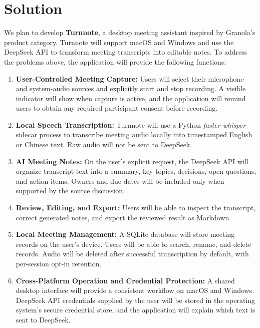 \documentclass[12pt,a4paper]{article}
\begin{document}
\section*{Solution}
We plan to develop \textbf{Turnnote}, a desktop meeting assistant inspired by Granola's product category. Turnnote will support macOS and Windows and use the DeepSeek API to transform meeting transcripts into editable notes. To address the problems above, the application will provide the following functions:\par
\begin{enumerate}
\item \textbf{User-Controlled Meeting Capture:} Users will select their microphone and system-audio sources and explicitly start and stop recording. A visible indicator will show when capture is active, and the application will remind users to obtain any required participant consent before recording.
\item \textbf{Local Speech Transcription:} Turnnote will use a Python \textit{faster-whisper} sidecar process to transcribe meeting audio locally into timestamped English or Chinese text. Raw audio will not be sent to DeepSeek.
\item \textbf{AI Meeting Notes:} On the user's explicit request, the DeepSeek API will organize transcript text into a summary, key topics, decisions, open questions, and action items. Owners and due dates will be included only when supported by the source discussion.
\item \textbf{Review, Editing, and Export:} Users will be able to inspect the transcript, correct generated notes, and export the reviewed result as Markdown.
\item \textbf{Local Meeting Management:} A SQLite database will store meeting records on the user's device. Users will be able to search, rename, and delete records. Audio will be deleted after successful transcription by default, with per-session opt-in retention.
\item \textbf{Cross-Platform Operation and Credential Protection:} A shared desktop interface will provide a consistent workflow on macOS and Windows. DeepSeek API credentials supplied by the user will be stored in the operating system's secure credential store, and the application will explain which text is sent to DeepSeek.
\end{enumerate}
\end{document}
